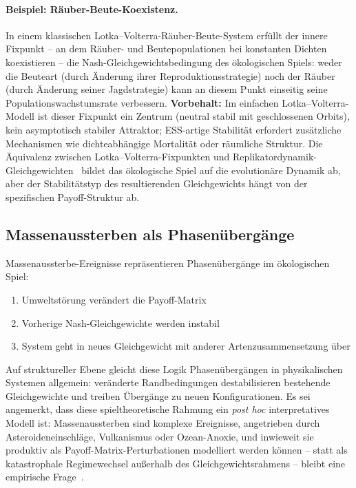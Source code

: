 \documentclass[12pt,a4paper]{article}
\theoremstyle{remark}
\begin{document}
\paragraph{Beispiel: Räuber-Beute-Koexistenz.}
In einem klassischen Lotka--Volterra-Räuber-Beute-System erfüllt der innere Fixpunkt -- an dem Räuber- und Beutepopulationen bei konstanten Dichten koexistieren -- die Nash-Gleichgewichtsbedingung des ökologischen Spiels: weder die Beuteart (durch Änderung ihrer Reproduktionsstrategie) noch der Räuber (durch Änderung seiner Jagdstrategie) kann an diesem Punkt einseitig seine Populationswachstumsrate verbessern. \textbf{Vorbehalt:} Im einfachen Lotka--Volterra-Modell ist dieser Fixpunkt ein Zentrum (neutral stabil mit geschlossenen Orbits), kein asymptotisch stabiler Attraktor; ESS-artige Stabilität erfordert zusätzliche Mechanismen wie dichteabhängige Mortalität oder räumliche Struktur. Die Äquivalenz zwischen Lotka--Volterra-Fixpunkten und Replikatordynamik-Gleichgewichten~\citep{HofbauerSigmund1998} bildet das ökologische Spiel auf die evolutionäre Dynamik ab, aber der Stabilitätstyp des resultierenden Gleichgewichts hängt von der spezifischen Payoff-Struktur ab.

\subsection{Massenaussterben als Phasenübergänge}

Massenaussterbe-Ereignisse repräsentieren Phasenübergänge im ökologischen Spiel:
\begin{enumerate}
    \item Umweltstörung verändert die Payoff-Matrix
    \item Vorherige Nash-Gleichgewichte werden instabil
    \item System geht in neues Gleichgewicht mit anderer Artenzusammensetzung über
\end{enumerate}

Auf struktureller Ebene gleicht diese Logik Phasenübergängen in physikalischen Systemen allgemein: veränderte Randbedingungen destabilisieren bestehende Gleichgewichte und treiben Übergänge zu neuen Konfigurationen. Es sei angemerkt, dass diese spieltheoretische Rahmung ein \emph{post hoc} interpretatives Modell ist: Massenaussterben sind komplexe Ereignisse, angetrieben durch Asteroideneinschläge, Vulkanismus oder Ozean-Anoxie, und inwieweit sie produktiv als Payoff-Matrix-Perturbationen modelliert werden können -- statt als katastrophale Regimewechsel außerhalb des Gleichgewichtsrahmens -- bleibt eine empirische Frage~\citep{GouldEldredge1977}.
\end{document}
